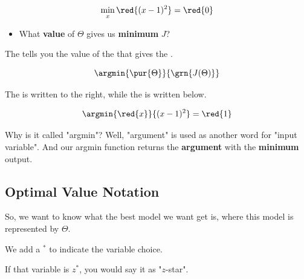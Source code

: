         \miniex 
        
        \begin{equation}
            \min_x{ \red{(x-1)^2} } = \red{0}
        \end{equation}
        
        \begin{itemize}
            \item What \textbf{value} of $\Theta$ gives us \textbf{minimum} $J$?
        \end{itemize}
        
        \begin{notation}
            The  tells you the value of the  that gives the .
            
            \begin{equation*}
                \argmin{ \pur{ \Theta } }{ \grn{ J(\Theta) } }
            \end{equation*}
            
            The  is written to the right, while the  is written below.
        
        \end{notation}
        
        \miniex
        
        \begin{equation}
            \argmin{\red{x}}{ (x-1)^2 } = \red{1}
        \end{equation}
        
        Why is it called "argmin"? Well, "argument" is used as another word for "input variable". And our argmin function returns the \textbf{argument} with the \textbf{minimum} output.
        
    \subsection{Optimal Value Notation}
        
        So, we want to know what the best model we want get is, where this model is represented by $\Theta$.\\
        
        \begin{notation}
            We add a  $^*$ to indicate the  variable choice.
            
            If that variable is $z^*$, you would say it as "$z$-star".
        \end{notation}
        

